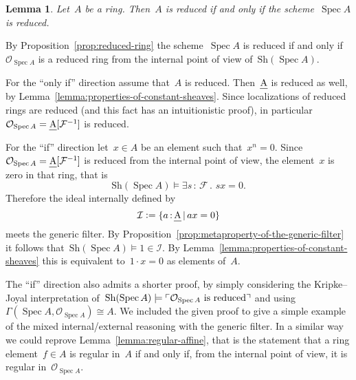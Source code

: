 \documentclass[10pt,reqno,a4paper]{amsbook}
\makeatletter
\theoremstyle{definition}
\theoremstyle{plain}
\newtheorem{lemma}[defn]{Lemma}
\theoremstyle{remark}
\newcommand{\F}{\mathcal{F}}
\renewcommand{\O}{\mathcal{O}}
\newcommand{\I}{\mathcal{I}}
\let\oldul\ul
\renewcommand{\ul}[1]{\text{\oldul{$#1$}}}
\newcommand{\Sh}{\mathrm{Sh}}
\DeclareMathOperator{\Spec}{Spec}
\newcommand{\?}{\,{:}\,}
\renewcommand{\_}{\mathpunct{.}\,}
\newcommand{\speak}[1]{\ulcorner\text{\textnormal{#1}}\urcorner}
\newcommand{\defeq}{\vcentcolon=}
\renewenvironment{proof}[1][\proofname]{\par
  \pushQED{\qed}%
  \normalfont \topsep6\p@\@plus6\p@\relax
  \trivlist
  \item[\hskip\labelsep
        \itshape
    #1\@addpunct{.}]\ignorespaces
}{%
  \popQED\endtrivlist\@endpefalse
}
\makeatother
\begin{document}
\begin{lemma}Let~$A$ be a ring. Then~$A$ is reduced if and only if the
scheme~$\Spec A$ is reduced.\end{lemma}
\begin{proof}By Proposition~\ref{prop:reduced-ring} the scheme~$\Spec A$ is
reduced if and only if~$\O_{\Spec A}$ is a reduced ring
from the internal point of view of~$\Sh(\Spec A)$.

For the ``only if'' direction assume that~$A$ is reduced. Then~$\ul{A}$ is
reduced as well, by Lemma~\ref{lemma:properties-of-constant-sheaves}. Since
localizations of reduced rings are reduced (and this fact has an intuitionistic
proof), in particular~$\O_{\Spec A} = \ul{A}[\F^{-1}]$ is reduced.

For the ``if'' direction let~$x \in A$ be an element such that~$x^n = 0$.
Since~$\O_{\Spec A} = \ul{A}[\F^{-1}]$ is reduced from the internal point of
view, the element~$x$ is zero in that ring, that is
\[ \Sh(\Spec A) \models \exists s\?\F\_ sx = 0. \]
Therefore the ideal internally defined by
\[ \I \defeq \{ a\?\ul{A} \,|\, ax = 0 \} \]
meets the generic filter. By
Proposition~\ref{prop:metaproperty-of-the-generic-filter} it follows
that~$\Sh(\Spec A) \models 1 \in \I$. By
Lemma~\ref{lemma:properties-of-constant-sheaves} this is equivalent to~$1 \cdot
x = 0$ as elements of~$A$.
\end{proof}

The ``if'' direction also admits a shorter proof, by simply
considering the Kripke--Joyal interpretation of~$\Sh(\Spec A) \models
\speak{$\O_{\Spec A}$ is reduced}$ and using~$\Gamma(\Spec A, \O_{\Spec A})
\cong A$. We included the given proof to give a simple example of the mixed
internal/external reasoning with the generic filter. In a similar way we could
reprove Lemma~\ref{lemma:regular-affine}, that is the statement that a ring
element~$f \in A$ is regular in~$A$ if and only if, from the internal point of
view, it is regular in~$\O_{\Spec A}$.
\end{document}
